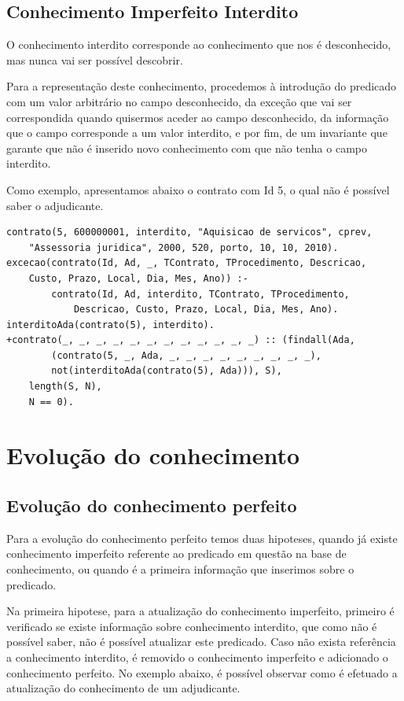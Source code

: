 \documentclass[a4paper]{report}
\begin{document}
\subsection{Conhecimento Imperfeito Interdito}

O conhecimento interdito corresponde ao conhecimento que nos é desconhecido, mas
nunca vai ser possível descobrir.

Para a representação deste conhecimento, procedemos à introdução do predicado
com um valor arbitrário no campo desconhecido, da exceção que vai ser
correspondida quando quisermos aceder ao campo desconhecido, da informação que o
campo corresponde a um valor interdito, e por fim, de um invariante que garante
que não é inserido novo conhecimento com que não tenha o campo interdito.

Como exemplo, apresentamos abaixo o contrato com Id 5, o qual não é possível
saber o adjudicante.

\begin{verbatim}
contrato(5, 600000001, interdito, "Aquisicao de servicos", cprev, 
    "Assessoria juridica", 2000, 520, porto, 10, 10, 2010).
excecao(contrato(Id, Ad, _, TContrato, TProcedimento, Descricao, 
    Custo, Prazo, Local, Dia, Mes, Ano)) :-
        contrato(Id, Ad, interdito, TContrato, TProcedimento, 
            Descricao, Custo, Prazo, Local, Dia, Mes, Ano).
interditoAda(contrato(5), interdito).
+contrato(_, _, _, _, _, _, _, _, _, _, _, _) :: (findall(Ada, 
        (contrato(5, _, Ada, _, _, _, _, _, _, _, _, _),
        not(interditoAda(contrato(5), Ada))), S),
    length(S, N),
    N == 0).
\end{verbatim}

\section{Evolução do conhecimento}

\subsection{Evolução do conhecimento perfeito}

Para a evolução do conhecimento perfeito temos duas hipoteses, quando já existe
conhecimento imperfeito referente ao predicado em questão na base de
conhecimento, ou quando é a primeira informação que inserimos sobre o predicado.

Na primeira hipotese, para a atualização do conhecimento imperfeito, primeiro é
verificado se existe informação sobre conhecimento interdito, que como não é
possível saber, não é possível atualizar este predicado. Caso não exista
referência a conhecimento interdito, é removido o conhecimento imperfeito e
adicionado o conhecimento perfeito. No exemplo abaixo, é possível observar como
é efetuado a atualização do conhecimento de um adjudicante. 
\end{document}
